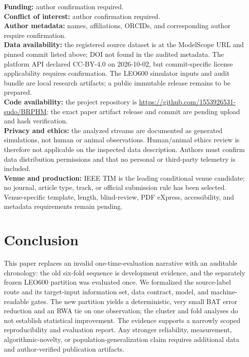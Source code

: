 \documentclass[journal]{IEEEtran}
\begin{document}
\noindent\textbf{Funding:} author confirmation required.\\
\textbf{Conflict of interest:} author confirmation required.\\
\textbf{Author metadata:} names, affiliations, ORCIDs, and corresponding author require confirmation.\\
\textbf{Data availability:} the registered source dataset is at the ModelScope URL and pinned commit listed above; DOI not found in the audited metadata. The platform API declared CC-BY-4.0 on 2026-10-02, but commit-specific license applicability requires confirmation. The LEO600 simulator inputs and audit bundle are local research artifacts; a public immutable release remains to be prepared.\\
\textbf{Code availability:} the project repository is \url{https://github.com/1553926531-sudo/BRPHM}; the exact paper artifact release and commit are pending upload and hash verification.\\
\textbf{Privacy and ethics:} the analyzed streams are documented as generated simulations, not human or animal observations. Human/animal ethics review is therefore not applicable on the inspected data description. Authors must confirm data distribution permissions and that no personal or third-party telemetry is included.\\
\textbf{Venue and production:} IEEE TIM is the leading conditional venue candidate; no journal, article type, track, or official submission rule has been selected. Venue-specific template, length, blind-review, PDF eXpress, accessibility, and metadata requirements remain pending.

\section{Conclusion}\label{sec:conclusion}
This paper replaces an invalid one-time-evaluation narrative with an auditable chronology: the old six-fold sequence is development evidence, and the separately frozen LEO600 partition was evaluated once. We formalized the source-label route and its target-input information set, data contract, model, and machine-readable gates. The new partition yields a deterministic, very small BAT error reduction and an RWA tie on one observation; the cluster and fold analyses do not establish statistical improvement. The evidence supports a narrowly scoped reproducibility and evaluation report. Any stronger reliability, measurement, algorithmic-novelty, or population-generalization claim requires additional data and author-verified publication artifacts.
\end{document}
